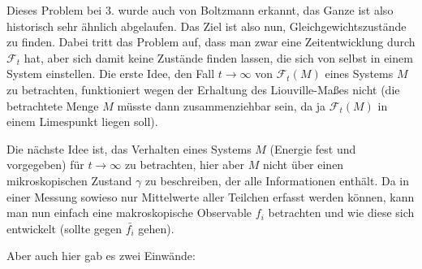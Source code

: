 Dieses Problem bei 3. wurde auch von Boltzmann erkannt, das Ganze ist also historisch sehr ähnlich abgelaufen. Das Ziel ist also nun, Gleichgewichtszustände zu finden. Dabei tritt das Problem auf, dass man zwar eine Zeitentwicklung durch $\mathcal{F}_t$ hat, aber sich damit keine Zustände finden lassen, die sich von selbst in einem System einstellen. Die erste Idee, den Fall $t\rightarrow \infty$ von $\mathcal{F}_t(M)$ eines Systems $M$ zu betrachten, funktioniert wegen der Erhaltung des Liouville-Maßes nicht (die betrachtete Menge $M$ müsste dann zusammenziehbar sein, da ja $\mathcal{F}_t(M)$ in einem Limespunkt liegen soll).

Die nächste Idee ist, das Verhalten eines Systems $M$ (Energie fest und vorgegeben) für $t\rightarrow \infty$ zu betrachten, hier aber $M$ nicht über einen mikroskopischen Zustand $\gamma$ zu beschreiben, der alle Informationen enthält. Da in einer Messung sowieso nur Mittelwerte aller Teilchen erfasst werden können, kann man nun einfach eine makroskopische Observable $f_i$ betrachten und wie diese sich entwickelt (sollte gegen $\bar{f_i}$ gehen).

Aber auch hier gab es zwei Einwände:

